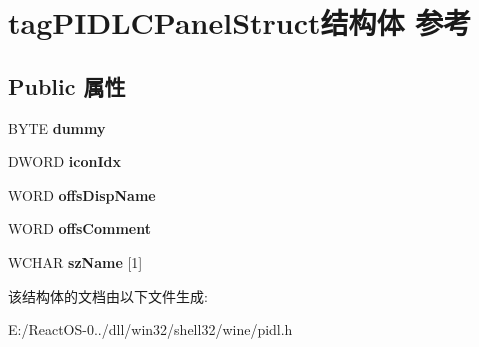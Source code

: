 \hypertarget{structtag_p_i_d_l_c_panel_struct}{}\section{tag\+P\+I\+D\+L\+C\+Panel\+Struct结构体 参考}
\label{structtag_p_i_d_l_c_panel_struct}
\subsection*{Public 属性}
\begin{DoxyCompactItemize}
\item 
\mbox{\label{structtag_p_i_d_l_c_panel_struct_a33d64ee07bfc8b040034db39de538d4d}} 
B\+Y\+TE {\bfseries dummy}
\item 
\mbox{\label{structtag_p_i_d_l_c_panel_struct_ac1a960828f26725e6674313dea2a9e20}} 
D\+W\+O\+RD {\bfseries icon\+Idx}
\item 
\mbox{\label{structtag_p_i_d_l_c_panel_struct_a8a02623cf455b7736abba580a7f43388}} 
W\+O\+RD {\bfseries offs\+Disp\+Name}
\item 
\mbox{\label{structtag_p_i_d_l_c_panel_struct_a192c6dde270faa3645201ff8e280a071}} 
W\+O\+RD {\bfseries offs\+Comment}
\item 
\mbox{\label{structtag_p_i_d_l_c_panel_struct_a7141fbe7d07e69f10bdcf71e1e14a264}} 
W\+C\+H\+AR {\bfseries sz\+Name} \mbox{[}1\mbox{]}
\end{DoxyCompactItemize}


该结构体的文档由以下文件生成\+:\begin{DoxyCompactItemize}
\item 
E\+:/\+React\+O\+S-\/0../dll/win32/shell32/wine/pidl.\+h\end{DoxyCompactItemize}
